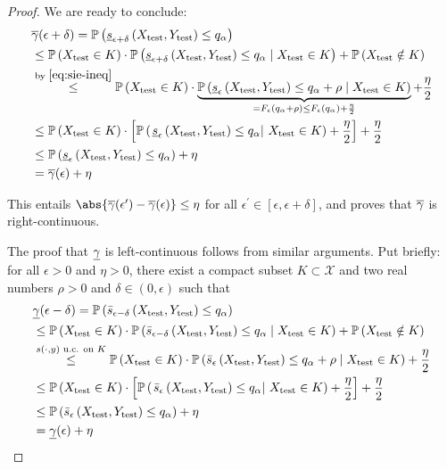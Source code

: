 \begin{proof}
    We are ready to conclude:
    \begin{equation*}
        \begin{aligned}
        & \overline{\gamma}(\epsilon+\delta)=\mathbb{P}\left(\underline{s}_{\epsilon+\delta}\left(X_\mathrm{test}, Y_\mathrm{test}\right) \leq q_\alpha\right) \\
        & \leq \mathbb{P}\left(X_\mathrm{test} \in K\right) \cdot \mathbb{P}\left(\underline{s}_{\epsilon+\delta}\left(X_\mathrm{test}, Y_\mathrm{test}\right) \leq q_\alpha \mid X_\mathrm{test} \in K\right)+\mathbb{P}\left(X_\mathrm{test} \notin K\right) \\
        & \stackrel{\text{by }\eqref{eq:sie-ineq}}{\leq} \mathbb{P}\left(X_\mathrm{test} \in K\right) \cdot \underbrace{\mathbb{P}\left(\underline{s}_{\epsilon}\left(X_\mathrm{test}, Y_\mathrm{test}\right) \leq q_\alpha+\rho \mid X_\mathrm{test} \in K\right)}_{=F_{\epsilon}\left(q_\alpha+\rho\right) 
        \leq F_{\epsilon}\left(q_\alpha\right)+\frac{\eta}{2}}+\frac{\eta}{2}\\
        & \leq \mathbb{P}\left(X_\mathrm{test} \in K\right) \cdot\left[\mathbb{P}\left(\left.\underline{s}_{\epsilon}\left(X_\mathrm{test},Y_\mathrm{test}\right) \leq q_\alpha \right\rvert\, X_\mathrm{test} \in K\right)+\frac{\eta}{2}\right]+\frac{\eta}{2} \\
        & \leq \mathbb{P}\left(\underline{s}_{\epsilon}\left(X_\mathrm{test}, Y_\mathrm{test}\right) \leq q_\alpha\right)+\eta \\
        & =\overline{\gamma}(\epsilon)+\eta
        \end{aligned}
    \end{equation*}

    This entails $\abs{\covmax(\epsilon^\prime)-\covmax(\epsilon)}\leq\eta$ for all $\epsilon^\prime \in [\epsilon,\epsilon+\delta]$, and proves that $\overline{\gamma}$ is right-continuous.

    The proof that $\underline{\gamma}$ is left-continuous follows from similar arguments. Put briefly: for all $\epsilon>0$ and $\eta>0$, there exist a compact subset $K\subset\mathcal{X}$ and two real numbers $\rho>0$ and $\delta\in(0,\epsilon)$ such that
    \begin{equation*}
        \begin{aligned}
            & \underline{\gamma}(\epsilon-\delta)=\mathbb{P}\left(\bar{s}_{\epsilon-\delta}\left(X_\mathrm{test}, Y_\mathrm{test}\right) \leq q_\alpha\right) \\
        & \leq \mathbb{P}\left(X_\mathrm{test} \in K\right) \cdot \mathbb{P}\left(\bar{s}_{\epsilon-\delta}\left(X_\mathrm{test}, Y_\mathrm{test}\right) \leq q_\alpha \mid X_\mathrm{test} \in K\right)+\mathbb{P}\left(X_\mathrm{test} \notin K\right) \\
        & \stackrel{s(\cdot,y) \text{ u.c. on } K}{\leq} \mathbb{P}\left(X_\mathrm{test} \in K\right) \cdot \mathbb{P}\left(\bar{s}_{\epsilon}\left(X_\mathrm{test}, Y_\mathrm{test}\right) \leq q_\alpha+\rho \mid X_\mathrm{test} \in K\right)+\frac{\eta}{2}\\
        & \leq \mathbb{P}\left(X_\mathrm{test} \in K\right) \cdot\left[\mathbb{P}\left(\left.\Bar{s}_{\epsilon}\left(X_\mathrm{test},Y_\mathrm{test}\right) \leq q_\alpha \right\rvert\, X_\mathrm{test} \in K\right)+\frac{\eta}{2}\right]+\frac{\eta}{2} \\
        & \leq \mathbb{P}\left(\Bar{s}_{\epsilon}\left(X_\mathrm{test}, Y_\mathrm{test}\right) \leq q_\alpha\right)+\eta \\
        & =\underline{\gamma}(\epsilon)+\eta
        \end{aligned}
    \end{equation*}
    

\end{proof}
